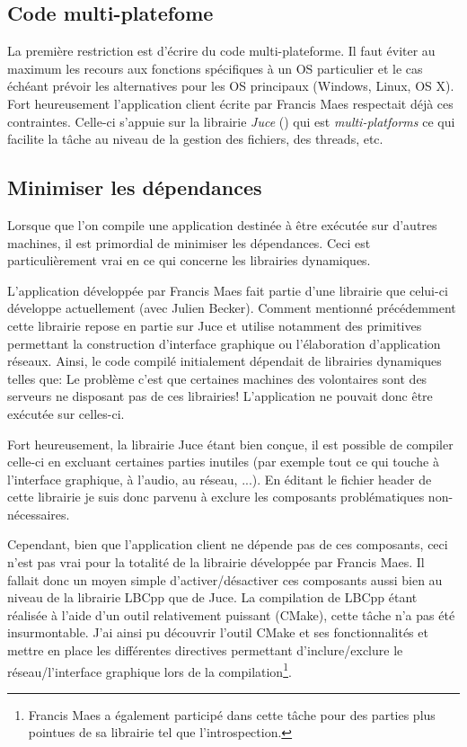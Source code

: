 \documentclass[a4paper, 11pt]{article}
\begin{document}
\subsection{Code multi-platefome}
La première restriction est d'écrire du code multi-plateforme. Il faut éviter au maximum les recours aux fonctions spécifiques à un OS particulier et le cas échéant prévoir les alternatives pour les OS principaux (Windows, Linux, OS X). Fort heureusement l'application client écrite par Francis Maes respectait déjà ces contraintes. Celle-ci s'appuie sur la librairie \textit{Juce} ()%
qui est \textit{multi-platforms} ce qui facilite la tâche au niveau de la gestion des fichiers, des threads, etc.


\subsection{Minimiser les dépendances}
Lorsque que l'on compile une application destinée à être exécutée sur d'autres machines, il est primordial de minimiser les dépendances. Ceci est particulièrement vrai en ce qui concerne les librairies dynamiques.

L'application développée par Francis Maes fait partie d'une librairie que celui-ci développe actuellement (avec Julien Becker). Comment mentionné précédemment cette librairie repose en partie sur Juce et utilise notamment des primitives permettant la construction d'interface graphique ou l'élaboration d'application réseaux. Ainsi, le code compilé initialement dépendait de librairies dynamiques telles que: %
Le problème c'est que certaines machines des volontaires sont des serveurs ne disposant pas de ces librairies! L'application ne pouvait donc être exécutée sur celles-ci.

Fort heureusement, la librairie Juce étant bien conçue, il est possible de compiler celle-ci en excluant certaines parties inutiles (par exemple tout ce qui touche à l'interface graphique, à l'audio, au réseau, ...). En éditant le fichier header de cette librairie je suis donc parvenu à exclure les composants problématiques non-nécessaires.

Cependant, bien que l'application client ne dépende pas de ces composants, ceci n'est pas vrai pour la totalité de la librairie développée par Francis Maes. Il fallait donc un moyen simple d'activer/désactiver ces composants aussi bien au niveau de la librairie LBCpp que de Juce. La compilation de LBCpp étant réalisée à l'aide d'un outil relativement puissant (CMake), cette tâche n'a pas été insurmontable. J'ai ainsi pu découvrir l'outil CMake et ses fonctionnalités et mettre en place les différentes directives permettant d'inclure/exclure le réseau/l'interface graphique lors de la compilation\footnote{Francis Maes a également participé dans cette tâche pour des parties plus pointues de sa librairie tel que l'introspection.}. 
\end{document}
